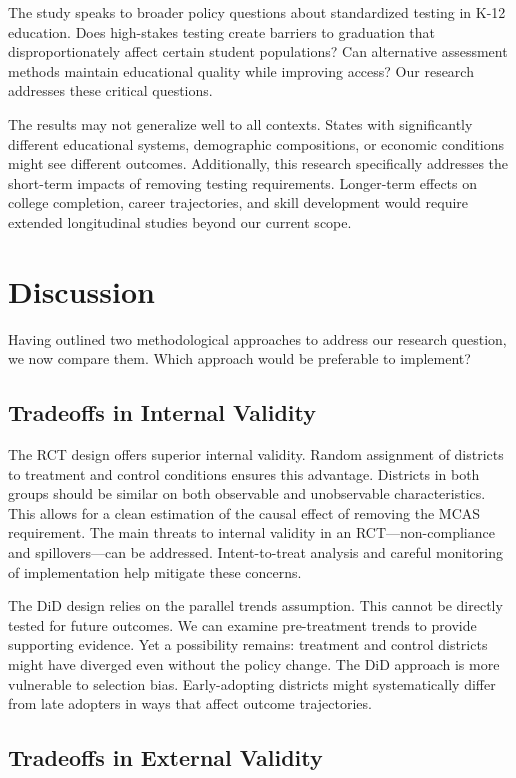 \documentclass[12pt]{article}
\begin{document}
The study speaks to broader policy questions about standardized testing in K-12 education. Does high-stakes testing create barriers to graduation that disproportionately affect certain student populations? Can alternative assessment methods maintain educational quality while improving access? Our research addresses these critical questions.

The results may not generalize well to all contexts. States with significantly different educational systems, demographic compositions, or economic conditions might see different outcomes. Additionally, this research specifically addresses the short-term impacts of removing testing requirements. Longer-term effects on college completion, career trajectories, and skill development would require extended longitudinal studies beyond our current scope.

\section{Discussion}

Having outlined two methodological approaches to address our research question, we now compare them. Which approach would be preferable to implement?

\subsection{Tradeoffs in Internal Validity}

The RCT design offers superior internal validity. Random assignment of districts to treatment and control conditions ensures this advantage. Districts in both groups should be similar on both observable and unobservable characteristics. This allows for a clean estimation of the causal effect of removing the MCAS requirement. The main threats to internal validity in an RCT—non-compliance and spillovers—can be addressed. Intent-to-treat analysis and careful monitoring of implementation help mitigate these concerns.

The DiD design relies on the parallel trends assumption. This cannot be directly tested for future outcomes. We can examine pre-treatment trends to provide supporting evidence. Yet a possibility remains: treatment and control districts might have diverged even without the policy change. The DiD approach is more vulnerable to selection bias. Early-adopting districts might systematically differ from late adopters in ways that affect outcome trajectories.

\subsection{Tradeoffs in External Validity}
\end{document}
